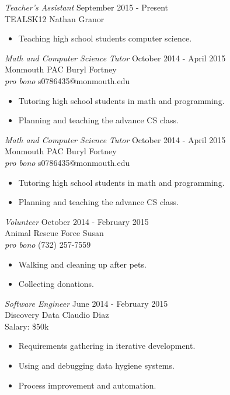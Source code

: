 \documentclass[margin]{res}
\begin{document}
\begin{resume}
    {\sl Teacher's Assistant} \hfill September 2015 - Present\\
	TEALSK12 \hfill Nathan Granor\\
	\begin{itemize}  \itemsep -2pt
		\item Teaching high school students computer science.
	\end{itemize}

	{\sl Math and Computer Science Tutor} \hfill October 2014 - April 2015\\
	Monmouth PAC \hfill Buryl Fortney\\
	{\sl pro bono} \hfill s0786435@monmouth.edu
	\begin{itemize}  \itemsep -2pt
		\item Tutoring high school students in math and programming.
		\item Planning and teaching the advance CS class.
	\end{itemize}

	{\sl Math and Computer Science Tutor} \hfill October 2014 - April 2015\\
	Monmouth PAC \hfill Buryl Fortney\\
	{\sl pro bono} \hfill s0786435@monmouth.edu
	\begin{itemize}  \itemsep -2pt
		\item Tutoring high school students in math and programming.
		\item Planning and teaching the advance CS class.
	\end{itemize}

	{\sl Volunteer} \hfill October 2014 - February 2015\\
	Animal Rescue Force \hfill Susan\\
	{\sl pro bono} \hfill (732) 257-7559
	\begin{itemize}  \itemsep -2pt
		\item Walking and cleaning up after pets.
		\item Collecting donations.
	\end{itemize}

	{\sl Software Engineer} \hfill June 2014 - February 2015\\
	Discovery Data \hfill Claudio Diaz\\
	Salary: \$50k \hfill
	\begin{itemize}  \itemsep -2pt
		\item Requirements gathering in iterative development.
		\item Using and debugging data hygiene systems.
		\item Process improvement and automation.
	\end{itemize}
	

\end{resume}
\end{document}
